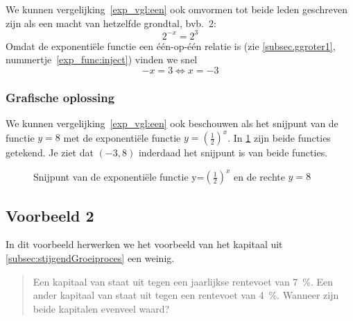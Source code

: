  We kunnen vergelijking~\eqref{exp_vgl:een} ook omvormen tot beide leden
 geschreven zijn als een macht van hetzelfde grondtal, bvb.\ 2:
 \begin{displaymath}
     2^{-x}=2^{3}
 \end{displaymath}
Omdat  de exponenti\"ele functie een één-op-één relatie is (zie \cref{subsec.ggroter1}, nummertje~\ref{exp_func:inject}) vinden we snel
\begin{displaymath}
    -x=3 \Leftrightarrow x=-3
\end{displaymath}


\subsubsection{Grafische oplossing}
We kunnen vergelijking~\eqref{exp_vgl:een} ook beschouwen als het snijpunt van de functie $y=8$ met 
de exponenti\"{e}le functie
$y=\left(\frac{1}{2}\right)^{x}$. In \cref{fig:snijp1} zijn beide functies getekend. Je ziet dat $(-3,8)$ inderdaad het snijpunt is van beide functies. 
\begin{figure}[htbp]
    \centering
    \caption{Snijpunt van de exponenti\"{e}le functie y=$(\frac12)^x$ en de rechte $y=8$}
    \label{fig:snijp1}
\end{figure}



\subsection{Voorbeeld 2}
In dit voorbeeld herwerken we het voorbeeld van het kapitaal uit \cref{subsec:stijgendGroeiproces} een weinig.
\begin{quote}

Een kapitaal van  staat uit tegen een
jaarlijkse rentevoet van \SI{7}{\percent}. Een ander kapitaal van  staat uit tegen een rentevoet van \SI{4}{\percent}. Wanneer zijn beide kapitalen evenveel waard?
\end{quote}


